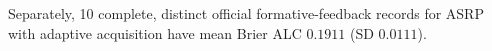 Separately, 10 complete, distinct official formative-feedback records for ASRP with adaptive acquisition have mean Brier ALC $0.1911$ (SD $0.0111$).
